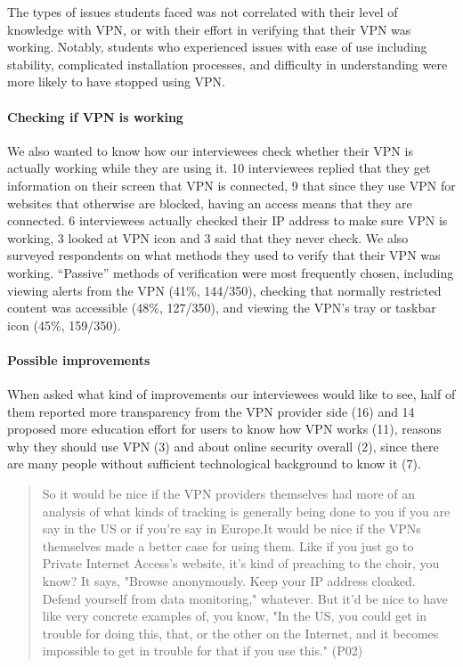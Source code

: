 

The types of issues students faced was not correlated with their level of
knowledge with VPN, or with their effort in verifying that their VPN was
working. Notably, students who experienced issues with ease of use including
stability, complicated installation processes, and difficulty in understanding
were more likely to have stopped using VPN. 

\paragraph{Checking if VPN is working} We also wanted to know how our
interviewees check whether their VPN is actually working while they are using
it. 10 interviewees replied that they get information on their screen that VPN
is connected, 9 that since they use VPN for websites that otherwise are
blocked, having an access means that they are connected. 6 interviewees
actually checked their IP address to make sure VPN is working, 3 looked at VPN
icon and 3 said that they never check. 
We also surveyed respondents on what methods they used to verify that their
VPN was working. “Passive” methods of verification were most frequently
chosen, including viewing alerts from the VPN (41\%, 144/350), checking that
normally restricted content was accessible (48\%, 127/350), and viewing the
VPN’s tray or taskbar icon (45\%, 159/350).






\paragraph{Possible improvements} When asked what kind of improvements our
interviewees would like to see, half of them reported more transparency from
the VPN provider side (16) and 14 proposed more education effort for users to
know how VPN works (11), reasons why they should use VPN (3) and about online
security overall (2), since there are many people without sufficient
technological background to know it (7). 

\begin{quote}So it would be nice if the VPN providers themselves had more of
    an analysis of what kinds of tracking is generally being done to you if
    you are say in the US or if you're say in Europe.It would be nice if the
    VPNs themselves made a better case for using them. Like if you just go to
    Private Internet Access's website, it's kind of preaching to the choir,
    you know? It says, "Browse anonymously. Keep your IP address cloaked.
    Defend yourself from data monitoring," whatever. But it'd be nice to have
    like very concrete examples of, you know, "In the US, you could get in
    trouble for doing this, that, or the other on the Internet, and it becomes
    impossible to get in trouble for that if you use this." (P02)\end{quote}


